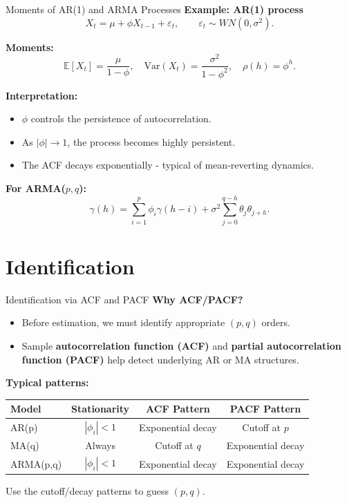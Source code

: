 \documentclass{beamer}
\begin{document}
\begin{frame}{Moments of AR(1) and ARMA Processes}
\small
\textbf{Example: AR(1) process}
\[
X_t = \mu + \phi X_{t-1} + \varepsilon_t, \qquad \varepsilon_t \sim WN(0,\sigma^2).
\]

\textbf{Moments:}
\[
\mathbb{E}[X_t] = \frac{\mu}{1-\phi}, \quad
\mathrm{Var}(X_t) = \frac{\sigma^2}{1-\phi^2}, \quad
\rho(h) = \phi^h.
\]

\pause
\textbf{Interpretation:}
\begin{itemize}
    \item $\phi$ controls the persistence of autocorrelation.
    \item As $|\phi| \to 1$, the process becomes highly persistent.
    \item The ACF decays exponentially - typical of mean-reverting dynamics.
\end{itemize}

\pause
\textbf{For ARMA($p,q$):}
\[
\gamma(h) = \sum_{i=1}^p \phi_i \gamma(h-i)
            + \sigma^2 \sum_{j=0}^{q-h} \theta_j \theta_{j+h}.
\]

\end{frame}





\section{Identification}


\begin{frame}{Identification via ACF and PACF}
\small
\textbf{Why ACF/PACF?}
\begin{itemize}
    \item Before estimation, we must identify appropriate $(p,q)$ orders.
    \item Sample \textbf{autocorrelation function (ACF)} and \textbf{partial autocorrelation function (PACF)} 
          help detect underlying AR or MA structures.
\end{itemize}
\medskip
\textbf{Typical patterns:}
\centering
\begin{tabular}{lccc}
\toprule
Model & Stationarity & ACF Pattern & PACF Pattern \\
\midrule
AR(p) & $|\phi_i|<1$ & Exponential decay& Cutoff at $p$ \\
MA(q) & Always & Cutoff at $q$ & Exponential decay\\
ARMA(p,q) & $|\phi_i|<1$ & Exponential decay& Exponential decay\\
\bottomrule
\end{tabular}
\medskip
Use the cutoff/decay patterns to guess $(p,q)$.
\end{frame}
\end{document}

